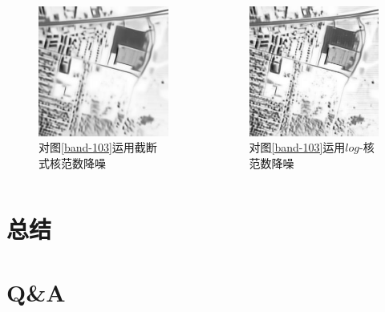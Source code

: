 \documentclass[10pt,aspectratio=43,mathserif]{beamer}
\begin{document}
\begin{frame}
\begin{columns}
\begin{figure}
\centering
\includegraphics[scale=0.2]{band-103-TNN.jpg}
\caption{对图\ref{band-103}运用截断式核范数降噪}
\end{figure}
\begin{figure}
\centering
\includegraphics[scale=0.2]{band-103-LNN.jpg}
\caption{对图\ref{band-103}运用$log$-核范数降噪}
\end{figure}

\end{columns}
\end{frame}

\section[总结]{总结}
%	
\section[Q\&A]{Q\&A}
%	
\end{document}
